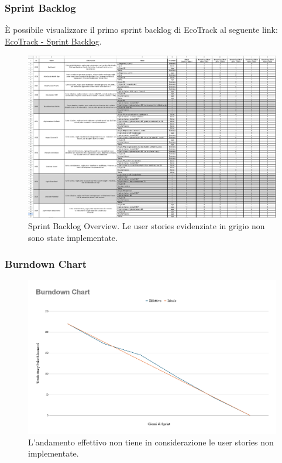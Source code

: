 \subsubsection{Sprint Backlog}
È possibile visualizzare il primo sprint backlog di EcoTrack al seguente link: \href{https://docs.google.com/spreadsheets/d/1UHLnqPdF-jQ3u2Tjfu37wLQoLWdG6EZI/edit?usp=sharing&ouid=117231945359659980757&rtpof=true&sd=true}{EcoTrack - Sprint Backlog}.
\begin{figure}[H]
    \centering
    \includegraphics[width=1\linewidth]{D3-G1//Img/Screenshot Sprint.png}
    \caption{Sprint Backlog Overview. Le user stories evidenziate in grigio non sono state implementate.}
    \label{fig:enter-label}
\end{figure}

\subsubsection{Burndown Chart}
\begin{figure}[H]
    \centering
    \includegraphics[width=1\linewidth]{D3-G1//Img/BurndownChart.png}
    \caption{L'andamento effettivo non tiene in considerazione le user stories non implementate.}
    \label{fig:enter-label}
\end{figure}

